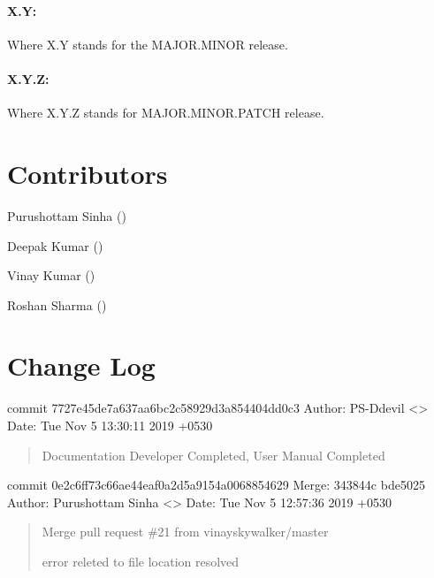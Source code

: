 \documentclass[letterpaper,10pt,english]{sphinxmanual}
\begin{document}
\subsubsection{X.Y:}
\label{\detokenize{developer:x-y}}
Where X.Y stands for the MAJOR.MINOR release.


\subsubsection{X.Y.Z:}
\label{\detokenize{developer:x-y-z}}
Where X.Y.Z stands for MAJOR.MINOR.PATCH release.


\chapter{Contributors}
\label{\detokenize{contributors:contributors}}\label{\detokenize{contributors::doc}}
Purushottam Sinha ()

Deepak Kumar ()

Vinay Kumar ()

Roshan Sharma ()


\chapter{Change Log}
\label{\detokenize{change:change-log}}\label{\detokenize{change::doc}}
commit 7727e45de7a637aa6bc2c58929d3a854404dd0c3
Author: PS-Ddevil \textless{}\textgreater{}
Date:   Tue Nov 5 13:30:11 2019 +0530
\begin{quote}

Documentation Developer Completed, User Manual Completed
\end{quote}

commit 0e2c6ff73c66ae44eaf0a2d5a9154a0068854629
Merge: 343844c bde5025
Author: Purushottam Sinha \textless{}\textgreater{}
Date:   Tue Nov 5 12:57:36 2019 +0530
\begin{quote}

Merge pull request \#21 from vinayskywalker/master

error releted to file location resolved
\end{quote}
\end{document}
